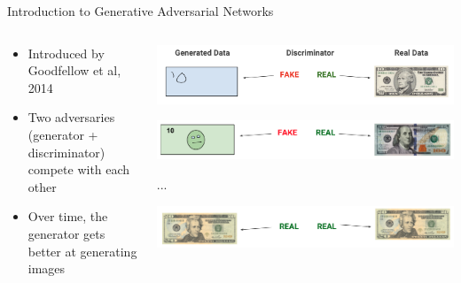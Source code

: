 \documentclass[8pt,xcolor=table,aspectratio=169]{beamer}
\begin{document}
\begin{frame}{Introduction to Generative Adversarial Networks}



\begin{columns}
\begin{column}{0.5\textwidth}

\begin{itemize}
 \item Introduced by Goodfellow et al, 2014

 \vspace{2em}

 \item Two adversaries (generator + discriminator) compete with each other

 \vspace{2em}

 \item Over time, the generator gets better at generating images
 
\end{itemize}

\end{column}
\begin{column}{0.5\textwidth}
\vspace{-3em}
\includegraphics[width=\textwidth]{8EREjP8.png} 

\includegraphics[width=\textwidth]{qocPf9V.png}\\ 

\begin{center}
...\\
\end{center}

\includegraphics[width=\textwidth]{p3KwCvb.png} 


\end{column}
\end{columns}
  
 
 \end{frame}
 
\end{document}
